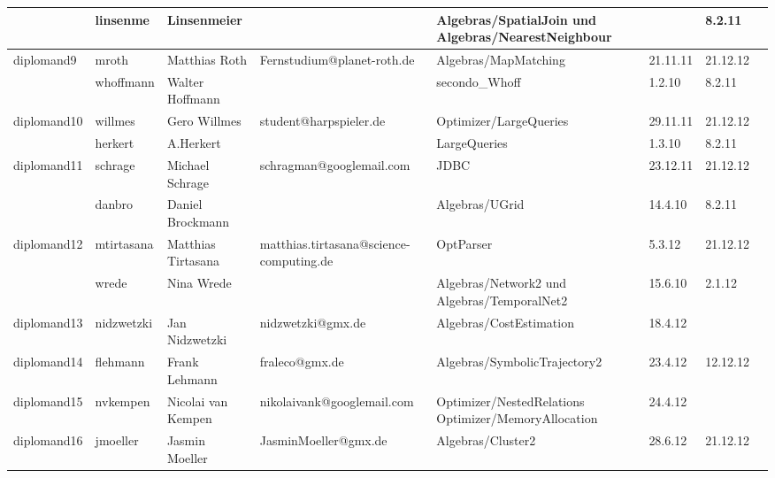 \documentclass[a4paper,9pt,landscape]{scrartcl}
\begin{document}
\begin{longtable}{|l|l|l|l|l|l|l|l|}
\cline{2-7}
\cellcolor{red}             &linsenme                 &Linsenmeier       &                   &Algebras/SpatialJoin und Algebras/NearestNeighbour& &8.2.11\\
\hline
\hline
\cellcolor{green}diplomand9 &mroth                    &Matthias Roth     &Fernstudium@planet-roth.de&Algebras/MapMatching   &21.11.11    &21.12.12\\
\cline{2-7}
\cellcolor{green}           &whoffmann                &Walter Hoffmann   &                    &secondo\_Whoff               &1.2.10      &8.2.11\\
\hline
\hline
\cellcolor{green}diplomand10&willmes                  &Gero Willmes      &student@harpspieler.de&Optimizer/LargeQueries     &29.11.11     &21.12.12\\
\cline{2-7}
\cellcolor{green}           &herkert                  &A.Herkert         &                   &LargeQueries                  &1.3.10       &8.2.11\\
\hline
\hline
\cellcolor{green}diplomand11&schrage                  &Michael Schrage   &schragman@googlemail.com&JDBC                     &23.12.11     &21.12.12\\
\cline{2-7}
\cellcolor{green}           &danbro                   &Daniel Brockmann  &                   &Algebras/UGrid                &14.4.10       &8.2.11\\
\hline
\hline
\cellcolor{green}diplomand12&mtirtasana               &Matthias Tirtasana&matthias.tirtasana@science-computing.de&OptParser &5.3.12       &21.12.12\\
\cline{2-7}
\cellcolor{green}           &wrede                    &Nina Wrede        &                    &Algebras/Network2 und Algebras/TemporalNet2&15.6.10&2.1.12\\
\hline
\hline
\rowcolor{yellow}\cellcolor{green}diplomand13& nidzwetzki&Jan Nidzwetzki    &nidzwetzki@gmx.de   &Algebras/CostEstimation        &18.4.12   &\\
\hline
\hline
\cellcolor{green}diplomand14&flehmann                 &Frank Lehmann     &fraleco@gmx.de      &Algebras/SymbolicTrajectory2   &23.4.12   &12.12.12\\
\hline
\hline
\rowcolor{yellow}\cellcolor{red}diplomand15  & nvkempen                 &Nicolai van Kempen&nikolaivank@googlemail.com&Optimizer/NestedRelations Optimizer/MemoryAllocation&24.4.12&\\
\hline
\hline
\cellcolor{green}diplomand16&jmoeller                  &Jasmin Moeller    &JasminMoeller@gmx.de &Algebras/Cluster2      &28.6.12  &21.12.12\\

\end{longtable}
\end{document}
